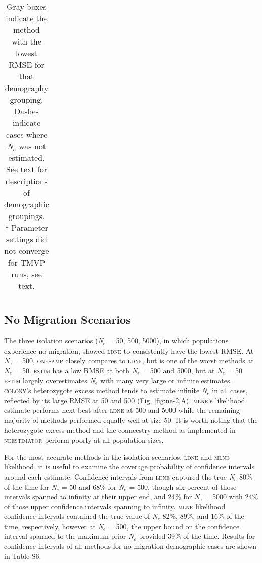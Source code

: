 \begin{table}[]
\begin{tabular}{llllllllllll}
\end{tabular}
\caption*{\small{Gray boxes indicate the method with the lowest RMSE for that demography grouping. 
Dashes indicate cases where \emph{N}$_e$ was not estimated. See text for descriptions of 
demographic groupings.} \\
\footnotesize{$\dagger$ Parameter settings did not converge for \textsc{TMVP} runs, see text.}}
\label{tab:ne-2}
\end{table}

\subsection{No Migration Scenarios}
The three isolation scenarios (\emph{N}$_e$ = 50, 500, 5000), in which populations experience 
no migration, showed \textsc{ldne} to consistently have the lowest RMSE. At \emph{N}$_e$ = 500, \textsc{onesamp} closely compares to 
\textsc{ldne}, but is one of the worst methods at \emph{N}$_e$ = 50. \textsc{estim} has a low RMSE 
at both \emph{N}$_e$ = 500 and 5000, but at \emph{N}$_e$ = 50 \textsc{estim} largely overestimates 
\emph{N}$_e$ with many very large or infinite estimates. \textsc{colony}'s heterozygote 
excess method tends to estimate infinite \emph{N}$_e$ in all cases, reflected by its 
large RMSE at 50 and 500 (Fig. \ref{fig:ne-2}A). \textsc{mlne}'s likelihood estimate performs next best 
after \textsc{ldne} at 500 and 5000 while the remaining majority of methods performed equally 
well at size 50. It is worth noting that the heterozygote excess method \citep{Pudovkin:1996} 
and the coancestry method \citep{Nomura:2008} as implemented in \textsc{neestimator} perform poorly at all population sizes.

For the most accurate methods in the isolation scenarios, \textsc{ldne} and \textsc{mlne} 
likelihood, it is useful to examine the coverage probability of confidence intervals around 
each estimate. Confidence intervals from \textsc{ldne} captured the true \emph{N}$_e$ 80\% 
of the time for \emph{N}$_e$ = 50 and 68\% for \emph{N}$_e$ = 500, though six percent of 
those intervals spanned to infinity at their upper end, and 24\% for \emph{N}$_e$ = 5000 with 
24\% of those upper confidence intervals spanning to infinity. \textsc{mlne} likelihood confidence 
intervals contained the true value of \emph{N}$_e$ 82\%, 89\%, and 16\% of the time, respectively, 
however at \emph{N}$_e$ = 500, the upper bound on the confidence interval spanned to the maximum 
prior \emph{N}$_e$ provided 39\% of the time. Results for confidence intervals of all methods 
for no migration demographic cases are shown in Table S6.

